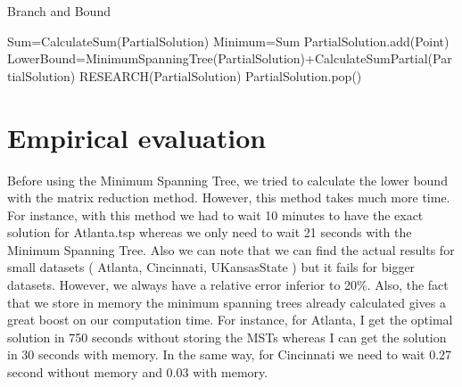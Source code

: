 \documentclass[12pt]{article}
\begin{document}
\begin{algorithm}
  \caption{Branch and Bound}\label{euclid}
  \begin{algorithmic}[1]
	\State Sum=CalculateSum(PartialSolution)
	      \State Minimum=Sum
	\EndIf
      \EndIf
	      \State PartialSolution.add(Point)
	      \State LowerBound=MinimumSpanningTree(PartialSolution)+CalculateSumPartial(PartialSolution)
		\State RESEARCH(PartialSolution)
	      \EndIf
	       \State PartialSolution.pop()
	\EndIf
      \EndFor
    \EndFunction
  \end{algorithmic}
\end{algorithm}

\section{Empirical evaluation}

Before using the Minimum Spanning Tree, we tried to calculate the lower bound with the matrix reduction method. However, this method takes much more time. For instance, with this method we had to wait 10 minutes to have the exact solution for Atlanta.tsp whereas we only need to wait 21 seconds with the Minimum Spanning Tree. Also we can note that we can find the actual results for small datasets ( Atlanta, Cincinnati, UKansasState ) but it fails for bigger datasets. However, we always have a relative error inferior to 20\%. Also, the fact that we store in memory the minimum spanning trees already calculated gives a great boost on our computation time. For instance, for Atlanta, I get the optimal solution in 750 seconds without storing the MSTs whereas I can get the solution in 30 seconds with memory. In the same way, for Cincinnati we need to wait 0.27 second without memory and 0.03 with memory. \\
\end{document}
